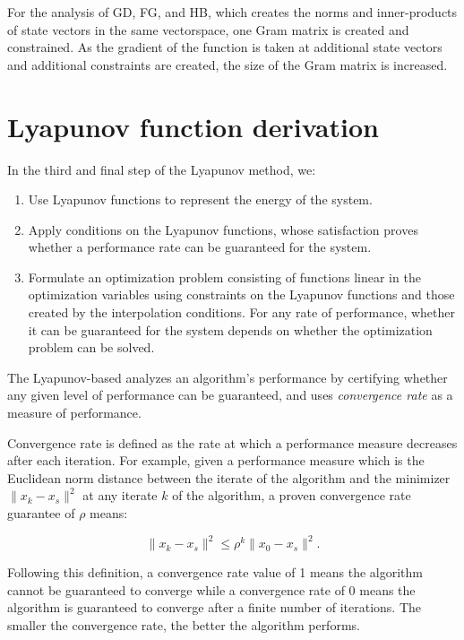 For the analysis of GD, FG, and HB, which creates the norms and inner-products of state vectors in the same vectorspace, one Gram matrix is created and constrained. As the gradient of the function is taken at additional state vectors and additional constraints are created, the size of the Gram matrix is increased.

\section{Lyapunov function derivation} \label{Lyapunov}
In the third and final step of the Lyapunov method, we:
\begin{enumerate}
	\item Use Lyapunov functions to represent the energy of the system.
	\item Apply conditions on the Lyapunov functions, whose satisfaction proves whether a performance rate can be guaranteed for the system.
	\item Formulate an optimization problem consisting of functions linear in the optimization variables using constraints on the Lyapunov functions and those created by the interpolation conditions. For any rate of performance, whether it can be guaranteed for the system depends on whether the optimization problem can be solved.
\end{enumerate}

The Lyapunov-based analyzes an algorithm's performance by certifying whether any given level of performance can be guaranteed, and uses \textit{convergence rate} as a measure of performance.

Convergence rate is defined as the rate at which a performance measure decreases after each iteration. For example, given a performance measure which is the Euclidean norm distance between the iterate of the algorithm and the minimizer $\|x_k - x_s\|^2$ at any iterate $k$ of the algorithm, a proven convergence rate guarantee of $\rho$ means:

\begin{equation} \label{eqn:convergence_rate}
	\|x_k - x_s\|^2 \leq \rho^k\|x_0 - x_s\|^2.
\end{equation}

Following this definition, a convergence rate value of 1 means the algorithm cannot be guaranteed to converge while a convergence rate of 0 means the algorithm is guaranteed to converge after a finite number of iterations. The smaller the convergence rate, the better the algorithm performs.

